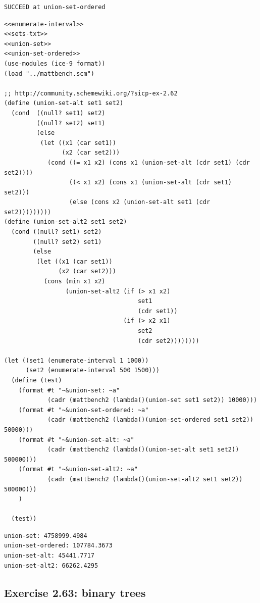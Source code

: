 \documentclass[final,fleqn,titlepage,twoside]{article}
\begin{document}
\begin{verbatim}
SUCCEED at union-set-ordered
\end{verbatim}

\begin{verbatim}
<<enumerate-interval>>
<<sets-txt>>
<<union-set>>
<<union-set-ordered>>
(use-modules (ice-9 format))
(load "../mattbench.scm")

;; http://community.schemewiki.org/?sicp-ex-2.62
(define (union-set-alt set1 set2) 
  (cond  ((null? set1) set2) 
         ((null? set2) set1) 
         (else  
          (let ((x1 (car set1)) 
                (x2 (car set2))) 
            (cond ((= x1 x2) (cons x1 (union-set-alt (cdr set1) (cdr set2)))) 
                  ((< x1 x2) (cons x1 (union-set-alt (cdr set1) set2))) 
                  (else (cons x2 (union-set-alt set1 (cdr set2)))))))))
(define (union-set-alt2 set1 set2) 
  (cond ((null? set1) set2) 
        ((null? set2) set1) 
        (else 
         (let ((x1 (car set1)) 
               (x2 (car set2))) 
           (cons (min x1 x2) 
                 (union-set-alt2 (if (> x1 x2) 
                                     set1 
                                     (cdr set1)) 
                                 (if (> x2 x1) 
                                     set2 
                                     (cdr set2))))))))

(let ((set1 (enumerate-interval 1 1000))
      (set2 (enumerate-interval 500 1500)))
  (define (test)
    (format #t "~&union-set: ~a"
            (cadr (mattbench2 (lambda()(union-set set1 set2)) 10000)))
    (format #t "~&union-set-ordered: ~a"
            (cadr (mattbench2 (lambda()(union-set-ordered set1 set2)) 50000)))
    (format #t "~&union-set-alt: ~a"
            (cadr (mattbench2 (lambda()(union-set-alt set1 set2)) 500000)))
    (format #t "~&union-set-alt2: ~a"
            (cadr (mattbench2 (lambda()(union-set-alt2 set1 set2)) 500000)))
    )

  (test))
\end{verbatim}

\begin{verbatim}
union-set: 4758999.4984
union-set-ordered: 107784.3673
union-set-alt: 45441.7717
union-set-alt2: 66262.4295
\end{verbatim}

\subsection{Exercise 2.63: binary trees}
\label{sec:orgeffc652}
\end{document}
